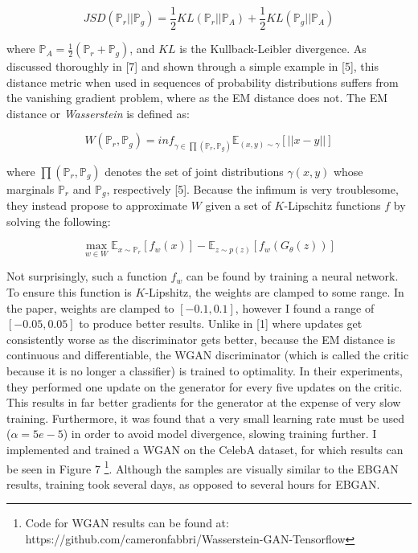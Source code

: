 \documentclass[9pt]{article}
\begin{document}
\[JSD(\mathbb{P}_r||\mathbb{P}_g) = \frac{1}{2} KL(\mathbb{P}_r || \mathbb{P}_A) + \frac{1}{2}KL(\mathbb{P}_g || \mathbb{P}_A)\]

\noindent where $\mathbb{P}_A = \frac{1}{2}(\mathbb{P}_r + \mathbb{P}_g)$, and $KL$ is the Kullback-Leibler divergence. As discussed thoroughly in [7] and shown through a simple example
in [5], this distance metric when used in sequences of probability distributions suffers from the vanishing gradient problem, where as the EM distance does not. The EM distance or
\textit{Wasserstein} is defined as:

\[ W(\mathbb{P}_r, \mathbb{P}_g) = inf_{\gamma \in \prod (\mathbb{P}_r, \mathbb{P}_g)} \mathbb{E}_{({x,y})\sim \gamma} [ || x - y || ] \]

\noindent where $\prod (\mathbb{P}_r, \mathbb{P}_g)$ denotes the set of joint distributions $\gamma (x,y)$ whose marginals $\mathbb{P}_r$ and $\mathbb{P}_g$, respectively [5]. Because
the infimum is very troublesome, they instead propose to approximate $W$ given a set of $K$-Lipschitz functions $f$ by solving the following:

\[ \max\limits_{w \in W} \mathbb{E}_{x \sim \mathbb{P}_r}[f_w(x)] - \mathbb{E}_{z \sim p(z)}[f_w(G_{\theta}(z))]\]

\noindent Not surprisingly, such a function $f_w$ can be found by training a neural network. To ensure this function is $K$-Lipshitz, the weights are clamped to some range. In the paper, weights
are clamped to $[-0.1, 0.1]$, however I found a range of $[-0.05, 0.05]$ to produce better results.
Unlike in [1] where updates get consistently worse as the discriminator gets better, because the EM distance is continuous and differentiable, the WGAN discriminator (which is called the critic
because it is no longer a classifier) is trained to optimality. In their experiments, they performed one update on the generator for every five updates on the critic. This results in far better
gradients for the generator at the expense of very slow training. Furthermore, it was found that a very small learning rate must be used ($\alpha = 5e-5$) in order to avoid model divergence,
slowing training further. I implemented and trained a WGAN on the CelebA dataset, for which results can be seen in Figure 7 \footnote{Code for WGAN results can be found at:
https://github.com/cameronfabbri/Wasserstein-GAN-Tensorflow}.
Although the samples are visually similar to the EBGAN results, training took several days, as opposed to several hours for EBGAN. \newline
\end{document}

